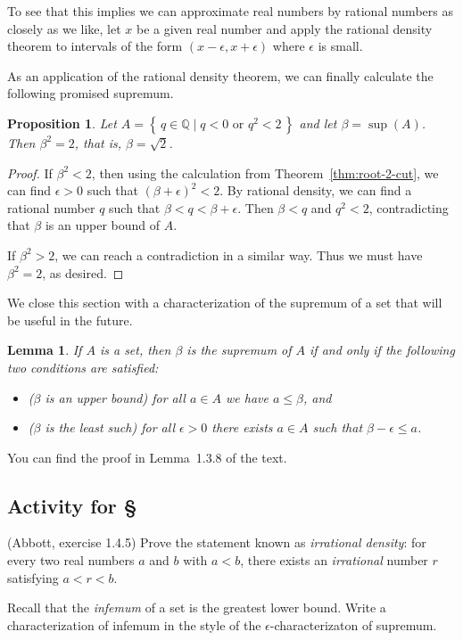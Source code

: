 \documentclass[11pt,oneside]{amsbook}
\newcommand{\set}[1]{\left\{\,#1\,\right\}}
\newcommand{\Q}{\mathbb Q}
\theoremstyle{definition}
\theoremstyle{plain}
\newtheorem{lemma}[theorem]{Lemma}
\newtheorem{proposition}[theorem]{Proposition}
\theoremstyle{definition}
\theoremstyle{remark}
\numberwithin{equation}{section}
\numberwithin{figure}{section}
\newcounter{activityitem}
\newenvironment{activity}{\begin{list}{\arabic{activityitem}.}{\usecounter{activityitem}\setlength{\itemsep}{.2in}}}{\end{list}}
\begin{document}
To see that this implies we can approximate real numbers by rational numbers as closely as we like, let $x$ be a given real number and apply the rational density theorem to intervals of the form $(x-\epsilon,x+\epsilon)$ where $\epsilon$ is small.

As an application of the rational density theorem, we can finally calculate the following promised supremum.

\begin{proposition}
  Let $A=\set{q\in\Q\mid q<0\text{ or }q^2<2}$ and let $\beta=\sup(A)$. Then $\beta^2=2$, that is, $\beta=\sqrt2$.
\end{proposition}

\begin{proof}
  If $\beta^2<2$, then using the calculation from Theorem~\ref{thm:root-2-cut}, we can find $\epsilon>0$ such that $(\beta+\epsilon)^2<2$. By rational density, we can find a rational number $q$ such that $\beta<q<\beta+\epsilon$. Then $\beta<q$ and $q^2<2$, contradicting that $\beta$ is an upper bound of $A$.
  
  If $\beta^2>2$, we can reach a contradiction in a similar way. Thus we must have $\beta^2=2$, as desired.
\end{proof}

We close this section with a characterization of the supremum of a set that will be useful in the future.

\begin{lemma}
  If $A$ is a set, then $\beta$ is the supremum of $A$ if and only if the following two conditions are satisfied:
  \begin{itemize}
  \item ($\beta$ is an upper bound) for all $a\in A$ we have $a\leq\beta$, and
  \item ($\beta$ is the least such) for all $\epsilon>0$ there exists $a\in A$ such that $\beta-\epsilon\leq a$.
  \end{itemize}
\end{lemma}

You can find the proof in Lemma~1.3.8 of the text.


\newpage
\subsection*{Activity for \S\thesection}

\begin{activity}
  \item (Abbott, exercise 1.4.5) Prove the statement known as \emph{irrational density}: for every two real numbers $a$ and $b$ with $a<b$, there exists an \emph{irrational} number $r$ satisfying $a<r<b$.
  \vspace{\fill}
  \item Recall that the \emph{infemum} of a set is the greatest lower bound. Write a characterization of infemum in the style of the $\epsilon$-characterizaton of supremum.
\end{activity}
\end{document}
